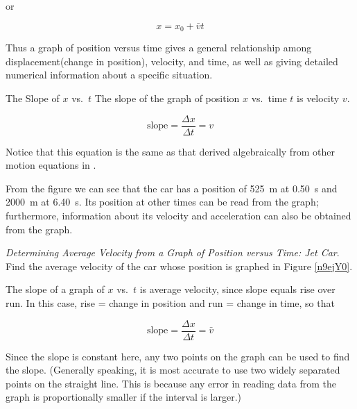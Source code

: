 \documentclass[../../main-ap-physics.tex]{subfiles}
\begin{document}
or

\begin{equation}
    x = x_0 + \bar{v} t
\end{equation}

Thus a graph of position versus time gives a general relationship among displacement(change in position), velocity, and time, as well as giving detailed numerical information about a specific situation.


\begin{gradient}{The Slope of $x$ vs.~$t$}
    The slope of the graph of position $x$ vs.~time $t$ is velocity $v$.
    
    \begin{equation}
        \text{slope} = \frac{\Delta x}{\Delta t} = v
    \end{equation}
    
    Notice that this equation is the same as that derived algebraically from other motion equations in . 
\end{gradient}

From the figure we can see that the car has a position of \SI{525}{m} at \SI{0.50}{s} and \SI{2000}{m} at \SI{6.40}{s}. Its position at other times can be read from the graph; furthermore, information about its velocity and acceleration can also be obtained from the graph.

\begin{example}
    \textit{Determining Average Velocity from a Graph of Position versus Time: Jet Car}. Find the average velocity of the car whose position is graphed in Figure \ref{n9ejY0}.
\end{example}

\Solution The slope of a graph of $x$ vs.~$t$ is average velocity, since slope equals rise over run. In this case, rise = change in position and run = change in time, so that

\begin{equation*}
    \text{slope} = \frac{\Delta x}{\Delta t} = \bar{v}
\end{equation*}

Since the slope is constant here, any two points on the graph can be used to find the slope. (Generally speaking, it is most accurate to use two widely separated points on the straight line. This is because any error in reading data from the graph is proportionally smaller if the interval is larger.)

\vspace{1em}
\end{document}
